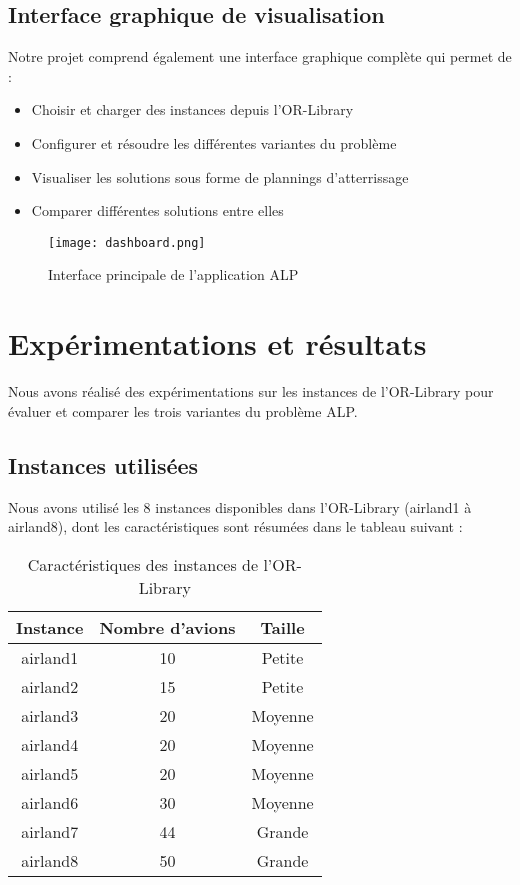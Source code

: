 \documentclass[a4paper,12pt]{report}
\begin{document}
\subsection{Interface graphique de visualisation}
Notre projet comprend également une interface graphique complète qui permet de :
\begin{itemize}
  \item Choisir et charger des instances depuis l'OR-Library
  \item Configurer et résoudre les différentes variantes du problème
  \item Visualiser les solutions sous forme de plannings d'atterrissage
  \item Comparer différentes solutions entre elles
\end{itemize}

\begin{figure}[H]
  \centering
  \texttt{[image: dashboard.png]}
  \caption{Interface principale de l'application ALP}
  \label{fig:dashboard}
\end{figure}

\section{Expérimentations et résultats}
Nous avons réalisé des expérimentations sur les instances de l'OR-Library pour évaluer et comparer les trois variantes du problème ALP.

\subsection{Instances utilisées}
Nous avons utilisé les 8 instances disponibles dans l'OR-Library (airland1 à airland8), dont les caractéristiques sont résumées dans le tableau suivant :

\begin{table}[H]
  \centering
  \begin{tabular}{ccc}
    \toprule
    \textbf{Instance} & \textbf{Nombre d'avions} & \textbf{Taille} \\
    \midrule
    airland1 & 10 & Petite \\
    airland2 & 15 & Petite \\
    airland3 & 20 & Moyenne \\
    airland4 & 20 & Moyenne \\
    airland5 & 20 & Moyenne \\
    airland6 & 30 & Moyenne \\
    airland7 & 44 & Grande \\
    airland8 & 50 & Grande \\
    \bottomrule
  \end{tabular}
  \caption{Caractéristiques des instances de l'OR-Library}
  \label{tab:instances}
\end{table}
\end{document}
